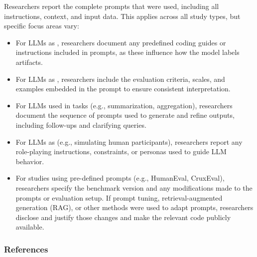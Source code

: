 Researchers \must report the complete prompts that were used, including all instructions, context, and input data. This applies across all study types, but specific focus areas vary:

\begin{itemize}
  \item For LLMs as \annotators, researchers \must document any predefined coding guides or instructions included in prompts, as these influence how the model labels artifacts.
  \item For LLMs as \judges, researchers \must include the evaluation criteria, scales, and examples embedded in the prompt to ensure consistent interpretation.
  \item For LLMs used in \synthesis tasks (e.g., summarization, aggregation), researchers \must document the sequence of prompts used to generate and refine outputs, including follow-ups and clarifying queries.
  \item For LLMs as \subjects (e.g., simulating human participants), researchers \must report any role-playing instructions, constraints, or personas used to guide LLM behavior.
  \item For \benchmarkingtasks studies using pre-defined prompts (e.g., HumanEval, CruxEval), researchers \must specify the benchmark version and any modifications made to the prompts or evaluation setup. If prompt tuning, retrieval-augmented generation (RAG), or other methods were used to adapt prompts, researchers \must disclose and justify those changes and \should make the relevant code publicly available.
\end{itemize}


\subsubsection{References}





